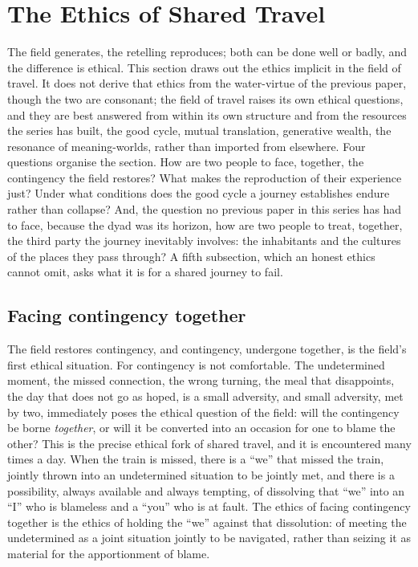 \section{The Ethics of Shared Travel}
\label{p21:sec:ethics}

\noindent
The field generates, the retelling reproduces; both can be done well or badly, and the difference is ethical. This section draws out the ethics implicit in the field of travel. It does not derive that ethics from the water-virtue of the previous paper, though the two are consonant; the field of travel raises its own ethical questions, and they are best answered from within its own structure and from the resources the series has built, the good cycle, mutual translation, generative wealth, the resonance of meaning-worlds, rather than imported from elsewhere. Four questions organise the section. How are two people to face, together, the contingency the field restores? What makes the reproduction of their experience just? Under what conditions does the good cycle a journey establishes endure rather than collapse? And, the question no previous paper in this series has had to face, because the dyad was its horizon, how are two people to treat, together, the third party the journey inevitably involves: the inhabitants and the cultures of the places they pass through? A fifth subsection, which an honest ethics cannot omit, asks what it is for a shared journey to fail.

\subsection{Facing contingency together}
\label{p21:sub:ethics-contingency}

The field restores contingency, and contingency, undergone together, is the field's first ethical situation. For contingency is not comfortable. The undetermined moment, the missed connection, the wrong turning, the meal that disappoints, the day that does not go as hoped, is a small adversity, and small adversity, met by two, immediately poses the ethical question of the field: will the contingency be borne \emph{together}, or will it be converted into an occasion for one to blame the other? This is the precise ethical fork of shared travel, and it is encountered many times a day. When the train is missed, there is a ``we'' that missed the train, jointly thrown into an undetermined situation to be jointly met, and there is a possibility, always available and always tempting, of dissolving that ``we'' into an ``I'' who is blameless and a ``you'' who is at fault. The ethics of facing contingency together is the ethics of holding the ``we'' against that dissolution: of meeting the undetermined as a joint situation jointly to be navigated, rather than seizing it as material for the apportionment of blame.

